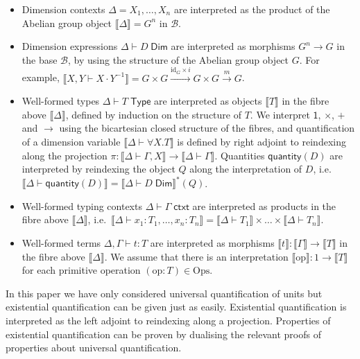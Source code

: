 \documentclass[a4paper,UKenglish]{lipics}
\theoremstyle{plain}
\newcommand{\ra}{\rightarrow}
\newcommand{\msf}[1]{\mathsf{#1}} %
\newcommand{\B}{\mathcal{B}}
\newcommand{\sem}[1]{\ensuremath{\llbracket #1 \rrbracket}}
\newcommand{\unitTy}{\msf{1}}
\newcommand{\qnt}{\msf{quantity}}
\newcommand{\Dj}[2]{#1 \vdash #2 \; \msf{ Dim}}
\newcommand{\id}{\mathrm{id}}
\begin{document}
\begin{itemize}
\item Dimension contexts $\Delta = X_1, \ldots, X_n$ are interpreted as the product of the Abelian group object $\sem{\Delta} = G^n$ in $\B$.
\item Dimension expressions $\Dj \Delta D$ are interpreted as morphisms $G^n \ra G$ in the base $\B$, by using the structure of the Abelian group object $G$. For example, $\sem{X, Y \vdash X \cdot Y^{-1}} = G\times G\xrightarrow{\id_G\times i}G\times G\xrightarrow m G$.

\item Well-formed types $\Delta \vdash T \; \msf{ Type}$ are interpreted as objects $\sem{T}$ in the fibre above $\sem{\Delta}$,  defined by induction on the structure of $T$. We interpret $\unitTy$, $\times$, $+$ and $\rightarrow$ using the bicartesian closed structure of the fibres, and quantification of a dimension variable $\sem{\Delta \vdash \forall X. T}$ is defined by right adjoint to reindexing along the projection $\pi: \sem{\Delta \vdash \Gamma, X} \rightarrow \sem{\Delta \vdash \Gamma}$. Quantities $\qnt(D)$ are interpreted by reindexing the object $Q$ along the interpretation of $D$, i.e. $\sem{\Delta \vdash \qnt(D)} = {\sem{\Dj \Delta D}}^* (Q)$.

\item Well-formed typing contexts $\Delta \vdash \Gamma \; \msf{ ctxt}$ are interpreted as products in the fibre above $\sem{\Delta}$, i.e.\ $\sem{\Delta \vdash x_1 : T_1 ,\ldots, x_n:T_n} = \sem{\Delta \vdash T_1} \times \ldots \times \sem{\Delta \vdash T_n}$.

\item Well-formed terms $\Delta, \Gamma \vdash t : T$ are interpreted as morphisms $\sem{t} : \sem{\Gamma} \ra \sem{T}$ in the fibre above $\sem{\Delta}$. We assume that there is an interpretation $\sem{\mathrm{op}} : 1 \to \sem{T}$ for each primitive operation $(\mathrm{op} : T) \in \mathrm{Ops}$.
\end{itemize}

In this paper we have only considered universal quantification of units but existential quantification can be given just as easily. Existential quantification is interpreted as the left adjoint to reindexing along a projection. Properties of  existential quantification can be proven by dualising the relevant proofs of properties about universal quantification.
\end{document}
